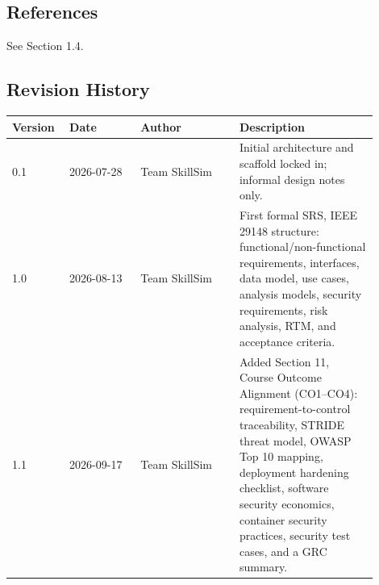 \documentclass[11pt]{article}
\begin{document}
\subsection{References}
See Section 1.4.

\subsection{Revision History}
\begin{longtable}{@{}p{0.12\linewidth}p{0.18\linewidth}p{0.25\linewidth}p{0.35\linewidth}@{}}
\toprule
\textbf{Version} & \textbf{Date} & \textbf{Author} & \textbf{Description} \\
\midrule
\endhead
0.1 & 2026-07-28 & Team SkillSim & Initial architecture and scaffold
      locked in; informal design notes only. \\
1.0 & 2026-08-13 & Team SkillSim & First formal SRS, IEEE 29148
      structure: functional/non-functional requirements, interfaces,
      data model, use cases, analysis models, security requirements,
      risk analysis, RTM, and acceptance criteria. \\
1.1 & 2026-09-17 & Team SkillSim & Added Section 11, Course Outcome
      Alignment (CO1--CO4): requirement-to-control traceability,
      STRIDE threat model, OWASP Top 10 mapping, deployment hardening
      checklist, software security economics, container security
      practices, security test cases, and a GRC summary. \\
\bottomrule
\end{longtable}
\end{document}

